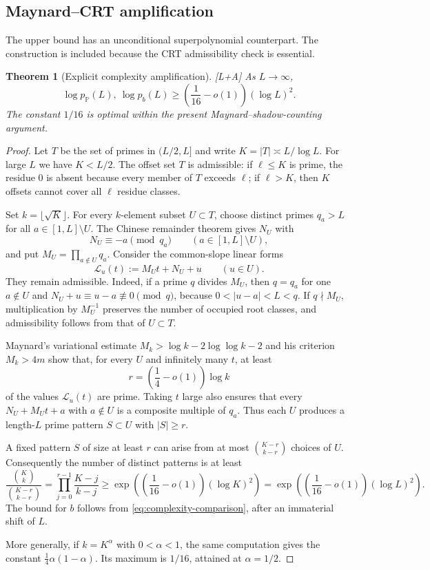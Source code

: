 \documentclass[11pt]{article}
\newtheorem{theorem}{Theorem}[section]
\theoremstyle{definition}
\theoremstyle{remark}
\newcommand{\PP}{\mathbb P}
\newcommand{\status}[1]{\textnormal{\textcolor{accent}{\footnotesize[#1]}}}
\begin{document}
\subsection{Maynard--CRT amplification}

The upper bound has an unconditional superpolynomial counterpart.  The construction is
included because the CRT admissibility check is essential.

\begin{theorem}[Explicit complexity amplification]\label{thm:maynard-complexity}
\status{L+A}
As $L\to\infty$,
\begin{equation}\label{eq:maynard-lower}
 \log p_{\PP}(L),\ \log p_b(L)
 \ge\left(\frac1{16}-o(1)\right)(\log L)^2.
\end{equation}
The constant $1/16$ is optimal within the present Maynard--shadow-counting
argument.
\end{theorem}

\begin{proof}
Let $T$ be the set of primes in $(L/2,L]$ and write $K=|T|\asymp L/\log L$.
For large $L$ we have $K<L/2$.  The offset set $T$ is admissible: if $\ell\le K$ is
prime, the residue $0$ is absent because every member of $T$ exceeds $\ell$; if
$\ell>K$, then $K$ offsets cannot cover all $\ell$ residue classes.

Set $k=\lfloor\sqrt K\rfloor$.  For every $k$-element subset $U\subset T$, choose
distinct primes $q_a>L$ for all $a\in[1,L]\setminus U$.  The Chinese remainder theorem
gives $N_U$ with
\[
 N_U\equiv-a\pmod{q_a}\qquad(a\in[1,L]\setminus U),
\]
and put $M_U=\prod_{a\notin U}q_a$.  Consider the common-slope linear forms
\[
 \mathcal L_u(t):=M_Ut+N_U+u\qquad(u\in U).
\]
They remain admissible.  Indeed, if a prime $q$ divides $M_U$, then $q=q_a$ for one
$a\notin U$ and $N_U+u\equiv u-a\not\equiv0\pmod q$, because
$0<|u-a|<L<q$.  If $q\nmid M_U$, multiplication by $M_U^{-1}$ preserves the number of
occupied root classes, and admissibility follows from that of $U\subset T$.

Maynard's variational estimate
$M_k>\log k-2\log\log k-2$ and his criterion $M_k>4m$
\cite{MaynardSmallGaps} show that, for every $U$ and infinitely many $t$, at least
\[
 r=\left(\frac14-o(1)\right)\log k
\]
of the values $\mathcal L_u(t)$ are prime.  Taking $t$ large also ensures that every
$N_U+M_Ut+a$ with $a\notin U$ is a composite multiple of $q_a$.  Thus each $U$
produces a length-$L$ prime pattern $S\subset U$ with $|S|\ge r$.

A fixed pattern $S$ of size at least $r$ can arise from at most
$\binom{K-r}{k-r}$ choices of $U$.  Consequently the number of distinct patterns is at
least
\[
 \frac{\binom Kk}{\binom{K-r}{k-r}}
 =\prod_{j=0}^{r-1}\frac{K-j}{k-j}
 \ge \exp\!\left(\left(\frac1{16}-o(1)\right)(\log K)^2\right)
 =\exp\!\left(\left(\frac1{16}-o(1)\right)(\log L)^2\right).
\]
The bound for $b$ follows from \eqref{eq:complexity-comparison}, after an immaterial
shift of $L$.

More generally, if $k=K^\alpha$ with $0<\alpha<1$, the same computation gives the
constant $\frac14\alpha(1-\alpha)$.  Its maximum is $1/16$, attained at
$\alpha=1/2$.
\end{proof}
\end{document}
